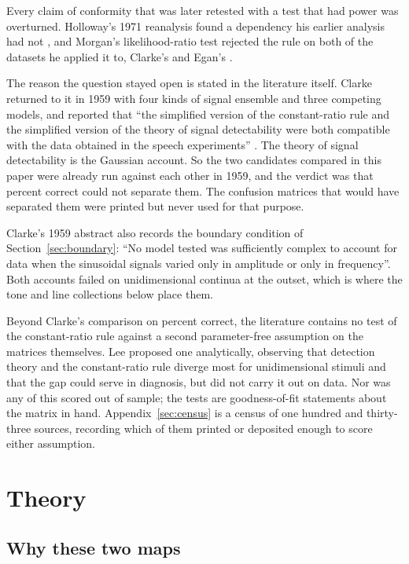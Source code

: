 \documentclass[11pt]{article}
\theoremstyle{italichead}
\begin{document}
Every claim of conformity that was later
retested with a test that had power was overturned. Holloway's 1971 reanalysis found a dependency his
earlier analysis had not \cite{holloway1970,holloway1971}, and Morgan's likelihood-ratio test rejected the rule on
both of the datasets he applied it to, Clarke's and Egan's \cite{egan1957,morgan1974}.

The reason the question stayed open is stated in the literature itself. Clarke returned to it in
1959 with four kinds of signal ensemble and three competing models, and reported that ``the
simplified version of the constant-ratio rule and the simplified version of the theory of signal
detectability were both compatible with the data obtained in the speech experiments''
\cite{clarke1959}. The theory of signal detectability is the Gaussian account. So the two
candidates compared in this paper were already run against each other in 1959, and the verdict
was that percent correct could not separate them. The confusion matrices that would have
separated them were printed but never used for that purpose.

Clarke's 1959 abstract also records the boundary condition of
Section~\ref{sec:boundary}: ``No model tested was sufficiently
complex to account for data when the sinusoidal signals varied only in amplitude or only in
frequency''. Both accounts failed on unidimensional continua at the outset, which is where the
tone and line collections below place them.

Beyond Clarke's comparison on percent correct, the literature contains no test of the
constant-ratio rule against a second parameter-free assumption on the matrices themselves.
Lee \cite{lee1968} proposed one analytically, observing that detection
theory and the constant-ratio rule diverge most for unidimensional stimuli and that the gap
could serve in diagnosis, but did not carry it out on data. Nor was any of this scored out of
sample; the tests are goodness-of-fit statements about the matrix in hand.
Appendix~\ref{sec:census} is a census of one hundred and thirty-three sources, recording which of them printed
or deposited enough to score either assumption.

\section{Theory}
\label{sec:theory}

\subsection{Why these two maps}
\label{sec:maps}
\end{document}
